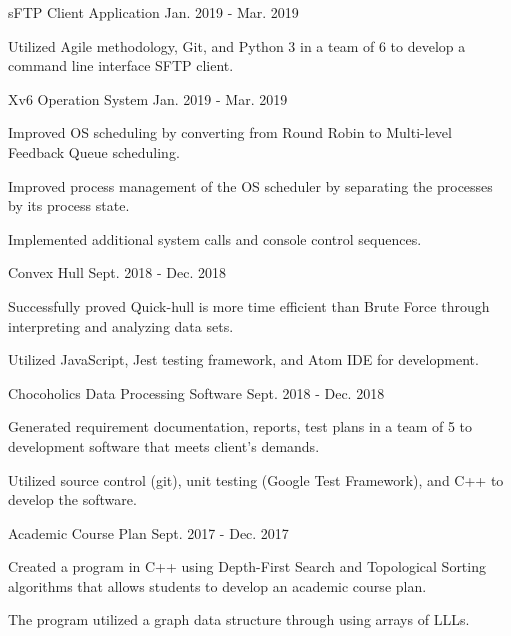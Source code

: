 
\begin{cventries}
  \cvproject
    {sFTP Client Application} %
    {Jan. 2019 - Mar. 2019} %
    {
      \begin{cvitems} %
        \item {Utilized Agile methodology, Git, and Python 3 in a team of 6 to develop a command line interface SFTP client.}
      \end{cvitems}
    }

 \cvproject
    {Xv6 Operation System} %
    {Jan. 2019 - Mar. 2019} %
    {
      \begin{cvitems} %
        \item {Improved OS scheduling by converting from Round Robin to Multi-level Feedback Queue scheduling.}
        \item {Improved process management of the OS scheduler by separating the processes by its process state.}
        \item {Implemented additional system calls and console control sequences.}
      \end{cvitems}
    }

  \cvproject
     {Convex Hull}
     {Sept. 2018 - Dec. 2018}
     {
       \begin{cvitems}
         \item {Successfully proved Quick-hull is more time efficient than Brute Force through interpreting and analyzing data sets.}
         \item {Utilized JavaScript, Jest testing framework, and Atom IDE for development.}
       \end{cvitems}
     }

  \cvproject
  {Chocoholics Data Processing Software}
  {Sept. 2018 - Dec. 2018}
  {
    \begin{cvitems}
      \item {Generated requirement documentation, reports, test plans in a team of 5 to development software that meets client's demands.}
      \item {Utilized source control (git), unit testing (Google Test Framework), and C++ to develop the software.}
    \end{cvitems}
  }

  \cvproject
    {Academic Course Plan}
    {Sept. 2017 - Dec. 2017}
    {
       \begin{cvitems}
         \item {Created a program in C++ using Depth-First Search and Topological Sorting algorithms that allows students to develop an academic course plan.}
         \item {The program utilized a graph data structure through using arrays of LLLs.}
      \end{cvitems}
    }

\end{cventries}
